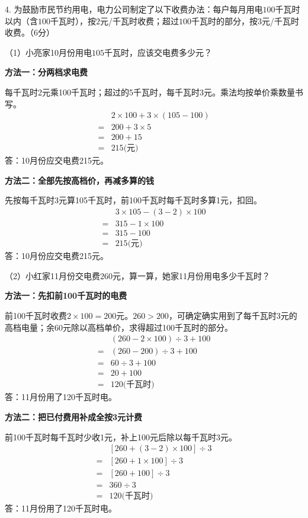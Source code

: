 4. 为鼓励市民节约用电，电力公司制定了以下收费办法：每户每月用电\(100\)千瓦时以内（含\(100\)千瓦时），按\(2\)元/千瓦时收费；超过\(100\)千瓦时的部分，按\(3\)元/千瓦时收费。（6分）\par （1）小亮家10月份用电\(105\)千瓦时，应该交电费多少元？\par
\begin{BookAnswer}
\textbf{方法一：分两档求电费}\par 每千瓦时2元乘100千瓦时；超过的5千瓦时，每千瓦时3元。乘法均按单价乘数量书写。\[\begin{aligned} &2\times100+3\times(105-100)\\ ={}&200+3\times5\\ ={}&200+15\\ ={}&215\text{(元)}\end{aligned}\]答：10月份应交电费215元。\par \textbf{方法二：全部先按高档价，再减多算的钱}\par 先按每千瓦时3元算105千瓦时，前100千瓦时每千瓦时多算1元，扣回。\[\begin{aligned} &3\times105-(3-2)\times100\\ ={}&315-1\times100\\ ={}&315-100\\ ={}&215\text{(元)}\end{aligned}\]答：10月份应交电费215元。\par
\end{BookAnswer}

（2）小红家11月份交电费\(260\)元，算一算，她家11月份用电多少千瓦时？\par
\begin{BookAnswer}
\textbf{方法一：先扣前100千瓦时的电费}\par 前100千瓦时收费\(2\times100=200\)元。\(260>200\)，可确定确实用到了每千瓦时3元的高档电量；余60元除以高档单价，求得超过100千瓦时的部分。\[\begin{aligned} &(260-2\times100)\div3+100\\ ={}&(260-200)\div3+100\\ ={}&60\div3+100\\ ={}&20+100\\ ={}&120\text{(千瓦时)}\end{aligned}\]答：11月份用了120千瓦时电。\par \textbf{方法二：把已付费用补成全按3元计费}\par 前100千瓦时每千瓦时少收1元，补上100元后除以每千瓦时3元。\[\begin{aligned} &[260+(3-2)\times100]\div3\\ ={}&[260+1\times100]\div3\\ ={}&[260+100]\div3\\ ={}&360\div3\\ ={}&120\text{(千瓦时)}\end{aligned}\]答：11月份用了120千瓦时电。\par
\end{BookAnswer}


